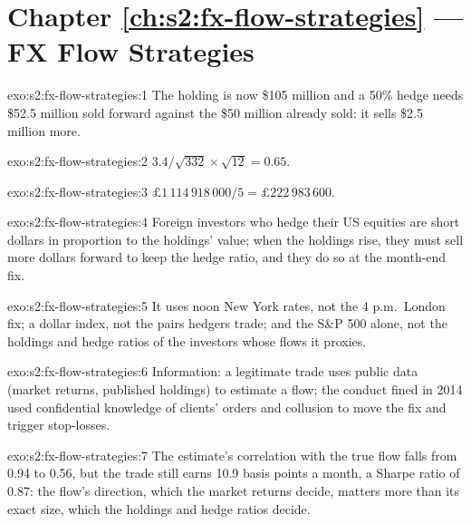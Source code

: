 \section*{Chapter \ref{ch:s2:fx-flow-strategies} --- FX Flow Strategies}

\begin{solution}{exo:s2:fx-flow-strategies:1}
The holding is now \$105 million and a 50\% hedge needs \$52.5 million sold forward against the \$50 million already sold: it sells \$2.5 million
more.
\end{solution}

\begin{solution}{exo:s2:fx-flow-strategies:2}
$3.4/\sqrt{332} \times \sqrt{12} = 0.65$.
\end{solution}

\begin{solution}{exo:s2:fx-flow-strategies:3}
$\pounds1\,114\,918\,000/5 = \pounds222\,983\,600$.
\end{solution}

\begin{solution}{exo:s2:fx-flow-strategies:4}
Foreign investors who hedge their US equities are short dollars in proportion to the holdings' value; when the holdings rise, they must sell more
dollars forward to keep the hedge ratio, and they do so at the month-end fix.
\end{solution}

\begin{solution}{exo:s2:fx-flow-strategies:5}
It uses noon New York rates, not the 4 p.m.\ London fix; a dollar index, not the pairs hedgers trade; and the S\&P 500 alone, not the holdings and
hedge ratios of the investors whose flows it proxies.
\end{solution}

\begin{solution}{exo:s2:fx-flow-strategies:6}
Information: a legitimate trade uses public data (market returns, published holdings) to estimate a flow; the conduct fined in 2014 used confidential
knowledge of clients' orders and collusion to move the fix and trigger stop-losses.
\end{solution}

\begin{solution}{exo:s2:fx-flow-strategies:7}
The estimate's correlation with the true flow falls from 0.94 to 0.56, but the trade still earns 10.9 basis points a month, a Sharpe ratio of 0.87: the
flow's direction, which the market returns decide, matters more than its exact size, which the holdings and hedge ratios decide.
\end{solution}

